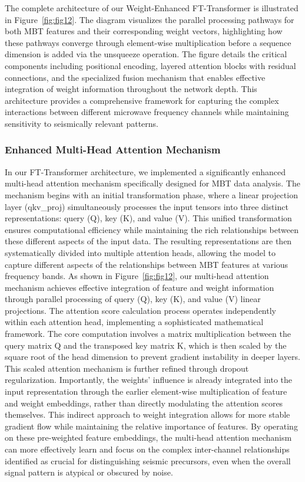 \documentclass[fleqn,10pt]{wlscirep_mdpi_style}
\begin{document}
The complete architecture of our Weight-Enhanced FT-Transformer is illustrated in Figure~\ref{fig:fig12}. The diagram visualizes the parallel processing pathways for both MBT features and their corresponding weight vectors, highlighting how these pathways converge through element-wise multiplication before a sequence dimension is added via the unsqueeze operation. The figure details the critical components including positional encoding, layered attention blocks with residual connections, and the specialized fusion mechanism that enables effective integration of weight information throughout the network depth. This architecture provides a comprehensive framework for capturing the complex interactions between different microwave frequency channels while maintaining sensitivity to seismically relevant patterns.


\subsubsection{Enhanced Multi-Head Attention Mechanism}
In our FT-Transformer architecture, we implemented a significantly enhanced multi-head attention mechanism specifically designed for MBT data analysis. The mechanism begins with an initial transformation phase, where a linear projection layer (qkv\_proj) simultaneously processes the input tensors into three distinct representations: query (Q), key (K), and value (V). This unified transformation ensures computational efficiency while maintaining the rich relationships between these different aspects of the input data. The resulting representations are then systematically divided into multiple attention heads, allowing the model to capture different aspects of the relationships between MBT features at various frequency bands. As shown in Figure~\ref{fig:fig12}, our multi-head attention mechanism achieves effective integration of feature and weight information through parallel processing of query (Q), key (K), and value (V) linear projections.
The attention score calculation process operates independently within each attention head, implementing a sophisticated mathematical framework. The core computation involves a matrix multiplication between the query matrix Q and the transposed key matrix K, which is then scaled by the square root of the head dimension to prevent gradient instability in deeper layers. This scaled attention mechanism is further refined through dropout regularization. Importantly, the weights' influence is already integrated into the input representation through the earlier element-wise multiplication of feature and weight embeddings, rather than directly modulating the attention scores themselves. This indirect approach to weight integration allows for more stable gradient flow while maintaining the relative importance of features. By operating on these pre-weighted feature embeddings, the multi-head attention mechanism can more effectively learn and focus on the complex inter-channel relationships identified as crucial for distinguishing seismic precursors, even when the overall signal pattern is atypical or obscured by noise.
\end{document}
